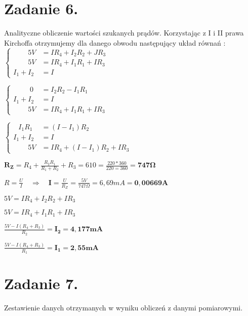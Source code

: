 \documentclass[polish,a4paper]{article}
\begin{document}
\section{Zadanie 6.}
Analityczne obliczenie wartości szukanych prądów. 
\newline
\newline
Korzystając z I i II prawa Kirchoffa otrzymujemy dla danego obwodu następujący układ równań : 
\bigbreak
\bigbreak
$ \begin{cases} 
\phantom{I_1 + }
	   5V& = IR_4 + I_2R_2 + JR_3\\
\phantom{I_1 + }
	   5V& = IR_4 + I_1R_1 + IR_3\\
I_1 + I_2& = I
\end{cases} $

\bigbreak
\bigbreak

$ \begin{cases}
\phantom{I_1 + .}
		0 &= I_2R_2 - I_1R_1\\
I_1 + I_2 &= I\\
\phantom{I_1 + }
	   5V &= IR_4 + I_1R_1 + IR_3
\end{cases} $

\bigbreak
\bigbreak

$ \begin{cases}
\phantom{I. }
   I_1R_1 &= (I - I_1)R_2\\
I_1 + I_2 &= I\\
\phantom{I_1 + }
	   5V &= IR_4 + (I - I_1)R_2 + IR_3
\end{cases} $

\bigbreak
\bigbreak


$\bm{R_Z} = R_4 + \frac{R_2R_1}{R_1 + R_2} + R_3 = 610 = \frac{220*360}{220 = 360} = \bm{747\Omega}$
\bigbreak

$R = \frac{U}{I}\quad\Rightarrow\quad \bm{I} = \frac{U}{R_Z} = \frac{5V}{747\Omega} = 6,69mA = \bm{0,00669A}$
\bigbreak
\bigbreak

$5V = IR_4 + I_2R_2 + IR_3$
\bigbreak

$5V = IR_4 + I_1R_1 + IR_3$
\bigbreak
\bigbreak

$\frac{5V - I(R_4 + R_3)}{R_2} = \bm{I_2 = 4,177mA}$
\bigbreak

$\frac{5V - I(R_4 + R_3)}{R_1} = \bm{I_1 = 2,55mA}$

\section{Zadanie 7.}
Zestawienie danych otrzymanych w wyniku obliczeń z danymi pomiarowymi.
\end{document}
